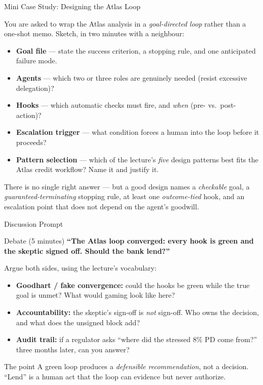 \documentclass[9pt,t]{beamer}
\begin{document}
\begin{frame}{Mini Case Study: Designing the Atlas Loop}

You are asked to wrap the Atlas analysis in a \emph{goal-directed loop} rather
than a one-shot memo. Sketch, in two minutes with a neighbour:

\medskip
\begin{itemize}
  \item \textbf{Goal file} --- state the success criterion, a stopping rule, and
        one anticipated failure mode.
  \item \textbf{Agents} --- which two or three roles are genuinely needed (resist
        excessive delegation)?
  \item \textbf{Hooks} --- which automatic checks must fire, and \emph{when}
        (pre- vs.\ post-action)?
  \item \textbf{Escalation trigger} --- what condition forces a human into the
        loop before it proceeds?
  \item \textbf{Pattern selection} --- which of the lecture's \emph{five} design
        patterns best fits the Atlas credit workflow? Name it and justify it.
\end{itemize}

\medskip
\begin{bigpicture}
There is no single right answer --- but a good design names a \emph{checkable}
goal, a \emph{guaranteed-terminating} stopping rule, at least one
\emph{outcome-tied} hook, and an escalation point that does not depend on the
agent's goodwill.
\end{bigpicture}
\end{frame}

\begin{frame}{Discussion Prompt}

\begin{block}{Debate (5 minutes)}
\textbf{``The Atlas loop converged: every hook is green and the skeptic signed
off. Should the bank lend?''}
\end{block}

\medskip
Argue both sides, using the lecture's vocabulary:
\begin{itemize}
  \item \textbf{Goodhart / fake convergence:} could the hooks be green while the
        true goal is unmet? What would gaming look like here?
  \item \textbf{Accountability:} the skeptic's sign-off is \emph{not} sign-off.
        Who owns the decision, and what does the unsigned block add?
  \item \textbf{Audit trail:} if a regulator asks ``where did the stressed
        $8\%$ PD come from?'' three months later, can you answer?
\end{itemize}

\medskip
\begin{alertblock}{The point}
A green loop produces a \emph{defensible recommendation}, not a decision. ``Lend''
is a human act that the loop can evidence but never authorize.
\end{alertblock}
\end{frame}
\end{document}
